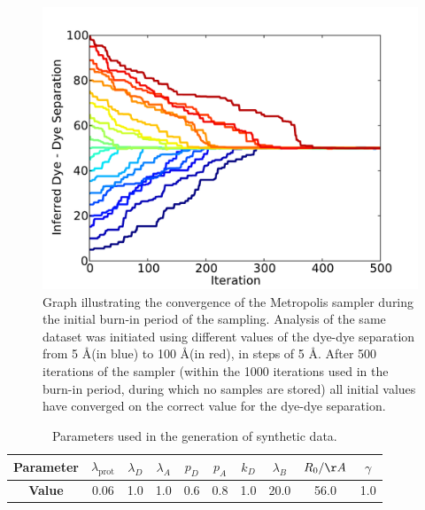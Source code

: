 \begin{figure}
   \begin{center}
      \includegraphics*[width=5in]{inference/S3_samples_summary_rsep.pdf}
      \caption{Graph illustrating the convergence of the Metropolis sampler during the initial burn-in period of the sampling. Analysis of the same dataset was initiated using different values of the dye-dye separation from 5 \AA (in blue) to 100 \AA (in red), in steps of 5 \AA. After 500 iterations of the sampler (within the 1000 iterations used in the burn-in period, during which no samples are stored) all initial values have converged on the correct value for the dye-dye separation.}
      \label{fig:MC_burnin_convergence}
   \end{center}
\end{figure}


\begin{center}
\begin{table}[ht]
\begin{tabular}{|cccccccccc|}
\hline
\textbf{Parameter} & $\lambda_{\text{prot}}$ & $\lambda_{D}$ & $\lambda_{A}$ & $p_D$ & $p_A$ & $k_D$ & $\lambda_{B}$ & $R_0 / \AA$ & $\gamma$ \\
\hline
\textbf{Value} & 0.06 & 1.0 & 1.0 & 0.6 & 0.8 & 1.0 & 20.0 & 56.0 & 1.0 \\
\hline
\end{tabular}
\caption{Parameters used in the generation of synthetic data.}
\label{tab:shared}
\end{table} 
\end{center}

